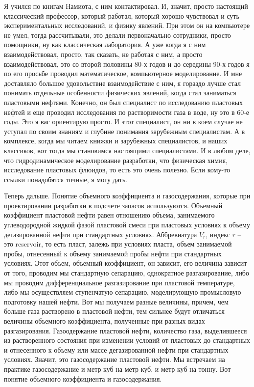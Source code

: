 \documentclass[main.tex]{subfiles}
\begin{document}
Я учился по книгам Намиота, с ним контактировал.
И, значит, просто настоящий классический профессор, который работал, который хорошо чувствовал и суть экспериментальных исследований, и физику явлений.
При этом он на компьютере не умел, тогда рассчитывали, это делали первоначально сотрудники, просто помощники, ну как классическая лаборатория.
А уже когда я с ним взаимодействовал, просто, так сказать, не работая с ним, а просто взаимодействовал, это со второй половины 80-х годов и до середины 90-х годов я по его просьбе проводил математическое, компьютерное моделирование.
И мне доставляло большое удовольствие взаимодействие с ним, я гораздо лучше стал понимать отдельные особенности физических явлений, когда стал заниматься пластовыми нефтями.
Конечно, он был специалист по исследованию пластовых нефтей и еще проводил исследования по растворимости газа в воде, ну это в 60-е годы.
Это я вас ориентирую просто.
И этот специалист, он ни в коем случае не уступал по своим знаниям и глубине понимания зарубежным специалистам.
А в комплексе, когда мы читаем книжки и зарубежных специалистов, и наших классиков, вот тогда мы становимся настоящими специалистами.
И в любом деле, что гидродинамическое моделирование разработки, что физическая химия, исследование пластовых флюидов, то есть это очень полезно.
Если кому-то ссылки понадобятся точные, я могу дать.

Теперь дальше.
Понятие объемного коэффициента и газосодержания, которые при проектировании разработки в подсчете запасов используются.
Объемный коэффициент пластовой нефти равен отношению объема, занимаемого углеводородной жидкой фазой пластовой смеси при пластовых условиях к объему дегазированной нефти при стандартных условиях.
Аббревиатура $V_r$, индекс $r$ -- это reservoir, то есть пласт, залежь при условиях пласта, объем занимаемой пробы, отнесенный к объему занимаемой пробы нефти при стандартных условиях.
Этот объем, объемный коэффициент, он зависит, его величина зависит от того, проводим мы стандартную сепарацию, однократное разгазирование, либо мы проводим дифференциальное разгазирование при пластовой температуре, либо мы осуществляем ступенчатую сепарацию, моделирующую промысловую подготовку нашей нефти.
Вот мы получаем разные величины, причем, чем больше газа растворено в пластовой нефти, тем сильнее будут отличаться величины объемного коэффициента, полученные при разных видах разгазирования.
Газоодержание пластовой нефти, количество газа, выделившееся из растворенного состояния при изменении условий от пластовых до стандартных и отнесенного к объему или массе дегазированной нефти при стандартных условиях.
Значит, это газосодержание пластовой нефти.
Мы встречаем на практике газосодержание и метр куб на метр куб, и метр куб на тонну.
Вот понятие объемного коэффициента и газосодержания.
\end{document}
